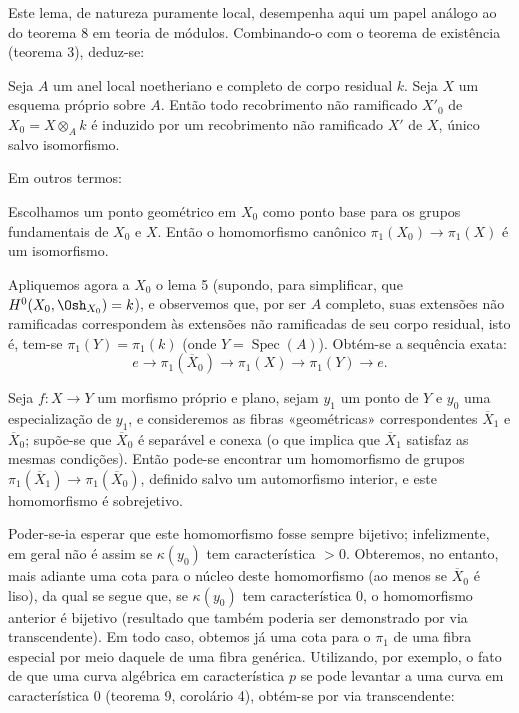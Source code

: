 Este lema, de natureza puramente local, desempenha aqui um papel análogo ao do
teorema 8 em teoria de módulos. Combinando-o com o teorema de existência
(teorema 3), deduz-se:

 Seja $A$ um anel local noetheriano e completo de corpo
residual $k$. Seja $X$ um esquema próprio sobre $A$. Então todo recobrimento
não ramificado $X'_0$ de $X_0=X\otimes_A k$ é induzido por um recobrimento não
ramificado $X'$ de $X$, único salvo isomorfismo.

Em outros termos:

 Escolhamos um ponto geométrico em $X_0$ como ponto base para
os grupos fundamentais de $X_0$ e $X$. Então o homomorfismo canônico
$\pi_1(X_0)\longrightarrow\pi_1(X)$ é um isomorfismo.

Apliquemos agora a $X_0$ o lema 5 (supondo, para simplificar, que
$H^0(X_0,\Osh_{X_0})=k$), e observemos que, por ser $A$ completo, suas
extensões não ramificadas correspondem às extensões não ramificadas de seu
corpo residual, isto é, tem-se $\pi_1(Y)=\pi_1(k)$ (onde
$Y=\operatorname{Spec}(A)$). Obtém-se a sequência exata:
\[
  e\longrightarrow\pi_1(\overline X_0)
  \longrightarrow\pi_1(X)\longrightarrow\pi_1(Y)\longrightarrow e.
\]

 Seja $f:X\longrightarrow Y$ um morfismo próprio e plano,
sejam $y_1$ um ponto de $Y$ e $y_0$ uma especialização de $y_1$, e consideremos
as fibras «geométricas» correspondentes $\overline X_1$ e $\overline X_0$;
supõe-se que $\overline X_0$ é separável e conexa (o que implica que
$\overline X_1$ satisfaz as mesmas condições). Então pode-se encontrar um
homomorfismo de grupos
$\pi_1(\overline X_1)\longrightarrow\pi_1(\overline X_0)$, definido salvo um
automorfismo interior, e este homomorfismo é sobrejetivo.

Poder-se-ia esperar que este homomorfismo fosse sempre bijetivo; infelizmente,
em geral não é assim se $\kappa(y_0)$ tem característica $>0$. Obteremos,
no entanto, mais adiante uma cota para o núcleo deste homomorfismo (ao menos se
$\overline X_0$ é liso), da qual se segue que, se $\kappa(y_0)$ tem
característica $0$, o homomorfismo anterior é bijetivo (resultado que também
poderia ser demonstrado por via transcendente). Em todo caso, obtemos já uma cota
para o $\pi_1$ de uma fibra especial por meio daquele de uma fibra genérica.
Utilizando, por exemplo, o fato de que uma curva algébrica em característica
$p$ se pode levantar a uma curva em característica $0$ (teorema 9, corolário
4), obtém-se por via transcendente:

